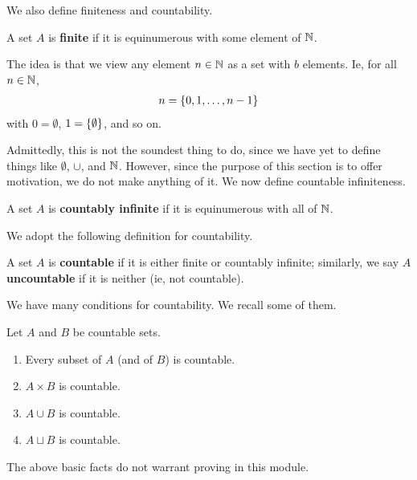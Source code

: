 We also define finiteness and countability.

\begin{boxdefinition}[Finiteness]
    A set $A$ is \textbf{finite} if it is equinumerous with some element of $\mathbb{N}$.
\end{boxdefinition}

The idea is that we view any element $n \in \mathbb{N}$ as a set with $b$ elements. Ie, for all $n \in \mathbb{N}$,
\begin{align*}
    n = \left\{ 0, 1, \ldots, n-1 \right\}
\end{align*}
with $0 = \emptyset$, $1 = \left\{ \emptyset \right\}$, and so on.

Admittedly, this is not the soundest thing to do, since we have yet to define things like $\emptyset$, $\cup$, and $\mathbb{N}$. However, since the purpose of this section is to offer motivation, we do not make anything of it. We now define countable infiniteness.

\begin{boxdefinition}
    A set $A$ is \textbf{countably infinite} if it is equinumerous with all of $\mathbb{N}$.
\end{boxdefinition}

We adopt the following definition for countability.

\begin{boxdefinition}
    A set $A$ is \textbf{countable} if it is either finite or countably infinite; similarly, we say $A$ \textbf{uncountable} if it is neither (ie, not countable).
\end{boxdefinition}

We have many conditions for countability. We recall some of them.

\begin{boxproposition}\label{Ch3:Prop:Countable_Conditions}
    Let $A$ and $B$ be countable sets.
    \begin{enumerate}[label = \normalfont \arabic*.]
        \item Every subset of $A$ (and of $B$) is countable.
        \item $A \times B$ is countable.
        \item $A \cup B$ is countable.
        \item $A \sqcup B$ is countable.
    \end{enumerate}
\end{boxproposition}

The above basic facts do not warrant proving in this module.

